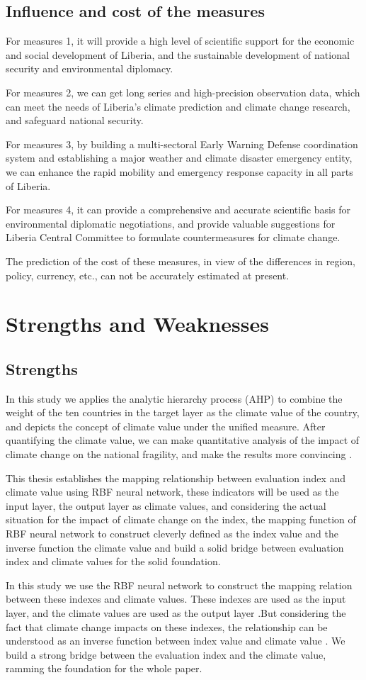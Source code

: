 \documentclass{mcmthesis}
\begin{document}
\subsection{Influence and cost of the measures}
For measures 1,  it will provide a high level of scientific support for the economic and social development of Liberia, and the sustainable development of national security and environmental diplomacy.
\par For measures 2,  we can get long series and high-precision observation data, which can meet the needs of Liberia's climate prediction and climate change research, and safeguard national security.
\par For measures 3,  by building a multi-sectoral Early Warning Defense coordination system and establishing a major weather and climate disaster emergency entity, we can enhance the rapid mobility and emergency response capacity in all parts of Liberia.
\par  For measures 4,  it can provide a comprehensive and accurate scientific basis for environmental diplomatic negotiations, and provide valuable suggestions for Liberia Central Committee to formulate countermeasures for climate change.
\par The prediction of the cost of these measures, in view of the differences in region, policy, currency, etc., can not be accurately estimated at present.

\section{Strengths and Weaknesses}
\subsection{Strengths}
In this study we applies the analytic hierarchy process (AHP) to combine the weight of the ten countries in the target layer as the climate value of the country, and depicts the concept of climate value under the unified measure. After quantifying the climate value, we can make quantitative analysis of the impact of climate change on the national fragility, and make the results more convincing .
\par This thesis establishes the mapping relationship between evaluation index and climate value using RBF neural network, these indicators will be used as the input layer, the output layer as climate values, and considering the actual situation for the impact of climate change on the index, the mapping function of RBF neural network to construct cleverly defined as the index value and the inverse function the climate value and build a solid bridge between evaluation index and climate values for the solid foundation.
\par In this study we use the RBF neural network to construct the mapping relation between these indexes and climate values. These indexes are used as the input layer, and the climate values are used as the output layer .But considering the fact that climate change impacts on these indexes, the relationship can be understood as an inverse function between index value and climate value . We build a strong bridge between the evaluation index and the climate value, ramming the foundation for the whole paper.
\end{document}

